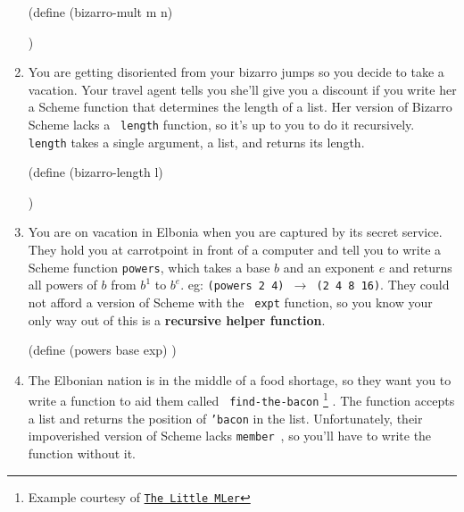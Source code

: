 \documentclass[pdftex,11pt]{article}
\newcommand{\member}{{\tt member}\ }
\begin{document}
\begin{enumerate}
\begin{answer}
(define (bizarro-mult m n)




\hspace{6in})
\end{answer}

\item You are getting disoriented from your bizarro jumps so you
  decide to take a vacation. Your travel agent tells you she'll give
  you a discount if you write her a Scheme function that determines
  the length of a list. Her version of Bizarro Scheme lacks a {\tt
    length} function, so it's up to you to do it recursively. {\tt
    length} takes a single argument, a list, and returns its length.

\begin{answer}
(define (bizarro-length l)




\hspace{6in})
\end{answer}

\item You are on vacation in Elbonia when you are captured by its
  secret service. They hold you at carrotpoint in front of a computer
  and tell you to write a Scheme function {\tt powers}, which takes a
  base $b$ and an exponent $e$ and returns all powers of $b$ from
  $b^1$ to $b^e$. eg: {\tt (powers 2 4) $\rightarrow$ (2 4 8
    16)}. They could not afford a version of Scheme with the {\tt
    expt} function, so you know your only way out of this is a {\bf
    recursive helper function}.

\begin{answer}
(define (powers base exp)
\hspace{6in})









\end{answer}

\newpage

\item The Elbonian nation is in the middle of a food shortage, so they
  want you to write a function to aid them called {\tt
    find-the-bacon} \footnote{Example courtesy of \underline{{\tt The
      Little MLer}}} . The function accepts a list and returns the
  position of {\tt 'bacon} in the list. Unfortunately, their
  impoverished version of Scheme lacks \member, so you'll have to write
  the function without it.


\end{enumerate}
\end{document}
